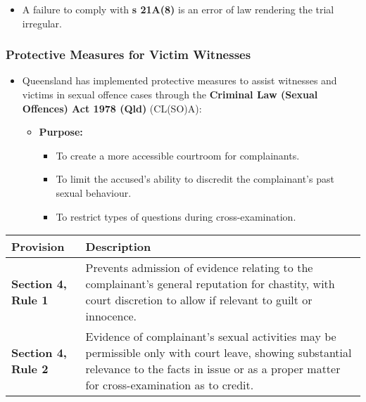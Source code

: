 \begin{itemize}
\tightlist
\item
  A failure to comply with \textbf{s 21A(8)} is an error of law
  rendering the trial irregular.
\end{itemize}

\subsubsection{Protective Measures for Victim
Witnesses}\label{protective-measures-for-victim-witnesses}

\begin{itemize}
\tightlist
\item
  Queensland has implemented protective measures to assist witnesses and
  victims in sexual offence cases through the \textbf{Criminal Law
  (Sexual Offences) Act 1978 (Qld)} (CL(SO)A):

  \begin{itemize}
  \tightlist
  \item
    \textbf{Purpose:}

    \begin{itemize}
    \tightlist
    \item
      To create a more accessible courtroom for complainants.
    \item
      To limit the accused's ability to discredit the complainant's past
      sexual behaviour.
    \item
      To restrict types of questions during cross-examination.
    \end{itemize}
  \end{itemize}
\end{itemize}

\begin{longtable}[]{@{}
  >{\raggedright\arraybackslash}p{}
  >{\raggedright\arraybackslash}p{}@{}}
\toprule\noalign{}
\begin{minipage}[b]{\linewidth}\raggedright
\textbf{Provision}
\end{minipage} & \begin{minipage}[b]{\linewidth}\raggedright
\textbf{Description}
\end{minipage} \\
\midrule\noalign{}
\endhead
\bottomrule\noalign{}
\endlastfoot
\textbf{Section 4, Rule 1} & Prevents admission of evidence relating to
the complainant's general reputation for chastity, with court discretion
to allow if relevant to guilt or innocence. \\
\textbf{Section 4, Rule 2} & Evidence of complainant's sexual activities
may be permissible only with court leave, showing substantial relevance
to the facts in issue or as a proper matter for cross-examination as to
credit. \\
\end{longtable}

